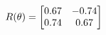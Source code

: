 \documentclass[preview]{standalone}
\begin{document}
\begin{align*}
\special{dvisvgm:raw <g id='unique000'>}R(\theta) = \begin{bmatrix}0.67 & -0.74\\0.74 & 0.67\end{bmatrix}\special{dvisvgm:raw </g>}
\end{align*}
\end{document}
